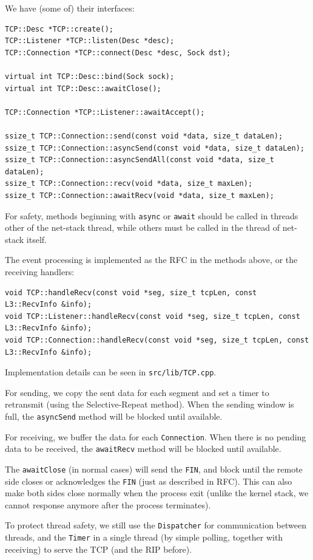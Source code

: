 \documentclass[a4paper]{article}
\begin{document}
  We have (some of) their interfaces:
  \begin{verbatim}
TCP::Desc *TCP::create();
TCP::Listener *TCP::listen(Desc *desc);
TCP::Connection *TCP::connect(Desc *desc, Sock dst);

virtual int TCP::Desc::bind(Sock sock);
virtual int TCP::Desc::awaitClose();

TCP::Connection *TCP::Listener::awaitAccept();

ssize_t TCP::Connection::send(const void *data, size_t dataLen);
ssize_t TCP::Connection::asyncSend(const void *data, size_t dataLen);
ssize_t TCP::Connection::asyncSendAll(const void *data, size_t dataLen);
ssize_t TCP::Connection::recv(void *data, size_t maxLen);
ssize_t TCP::Connection::awaitRecv(void *data, size_t maxLen);
  \end{verbatim}
  For safety, methods beginning with \texttt{async} or \texttt{await} should be called in threads other of the net-stack thread, while others must be called in the thread of net-stack itself.

  The event processing is implemented as the RFC in the methods above, or the receiving handlers:
  \begin{verbatim}
void TCP::handleRecv(const void *seg, size_t tcpLen, const L3::RecvInfo &info);
void TCP::Listener::handleRecv(const void *seg, size_t tcpLen, const L3::RecvInfo &info);
void TCP::Connection::handleRecv(const void *seg, size_t tcpLen, const L3::RecvInfo &info);
  \end{verbatim}

  Implementation details can be seen in \texttt{src/lib/TCP.cpp}.

  For sending, we copy the sent data for each segment and set a timer to retransmit (using the Selective-Repeat method).
  When the sending window is full, the \texttt{asyncSend} method will be blocked until available.

  For receiving, we buffer the data for each \texttt{Connection}.
  When there is no pending data to be received, the \texttt{awaitRecv} method will be blocked until available.

  The \texttt{awaitClose} (in normal cases) will send the \texttt{FIN}, and block until the remote side closes or acknowledges the \texttt{FIN} (just as described in RFC).
  This can also make both sides close normally when the process exit (unlike the kernel stack, we cannot response anymore after the process terminates).

  To protect thread safety, we still use the \texttt{Dispatcher} for communication between threads, and the \texttt{Timer} in a single thread (by simple polling, together with receiving) to serve the TCP (and the RIP before).
\end{document}
